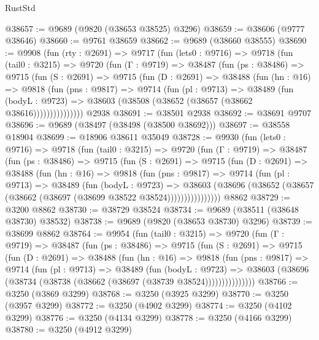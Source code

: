 \begin{lexlean}{RustStd}
\begin{coremodule}
@38657 := @9689 (@9820 (@38653 @38525) @3296)
@38659 := @38606 (@9777 @38646)
@38660 := @9761 @38659
@38662 := @9689 (@38660 @38555)
@38690 := @9908
    (fun (rty : @2691) =>
    @9717
      (fun (lets0 : @9716) =>
      @9718
        (fun (tail0 : @3215) =>
        @9720
          (fun (Γ : @9719) =>
          @38487
            (fun (ps : @38486) =>
            @9715
              (fun (S : @2691) =>
              @9715
                (fun (D : @2691) =>
                @38488
                  (fun (hn : @16) =>
                  @9818
                    (fun (pns : @9817) =>
                    @9714
                      (fun (pl : @9713) =>
                      @38489
                        (fun (bodyL : @9723) =>
                        @38603 (@38508 (@38652 (@38657 (@38662 @38616)))))))))))))))
    @2938
@38691 := @38501 @2938
@38692 := @38691 @9707
@38696 := @9689 (@38497 (@38498 (@38500 @38692)))
@38697 := @38558 @18904
@38699 := @18906 @38611 @35049
@38728 := @9930
    (fun (lets0 : @9716) =>
    @9718
      (fun (tail0 : @3215) =>
      @9720
        (fun (Γ : @9719) =>
        @38487
          (fun (ps : @38486) =>
          @9715
            (fun (S : @2691) =>
            @9715
              (fun (D : @2691) =>
              @38488
                (fun (hn : @16) =>
                @9818
                  (fun (pns : @9817) =>
                  @9714
                    (fun (pl : @9713) =>
                    @38489
                      (fun (bodyL : @9723) =>
                      @38603
                        (@38696
                          (@38652 (@38657 (@38662 (@38697 (@38699 @38522 @38524))))))))))))))))
    @8862
@38729 := @3200 @8862
@38730 := @38729 @38524
@38734 := @9689 (@38511 (@38648 @38730) @38532)
@38738 := @9689 (@9820 (@38653 @38730) @3296)
@38739 := @38699 @8862
@38764 := @9954
    (fun (tail0 : @3215) =>
    @9720
      (fun (Γ : @9719) =>
      @38487
        (fun (ps : @38486) =>
        @9715
          (fun (S : @2691) =>
          @9715
            (fun (D : @2691) =>
            @38488
              (fun (hn : @16) =>
              @9818
                (fun (pns : @9817) =>
                @9714
                  (fun (pl : @9713) =>
                  @38489
                    (fun (bodyL : @9723) =>
                    @38603 (@38696 (@38734 (@38738 (@38662 (@38697 (@38739 @38524)))))))))))))))
@38766 := @3250 (@3869 @3299)
@38768 := @3250 (@3925 @3299)
@38770 := @3250 (@3957 @3299)
@38772 := @3250 (@4902 @3299)
@38774 := @3250 (@4102 @3299)
@38776 := @3250 (@4134 @3299)
@38778 := @3250 (@4166 @3299)
@38780 := @3250 (@4912 @3299)

\end{coremodule}
\end{lexlean}

